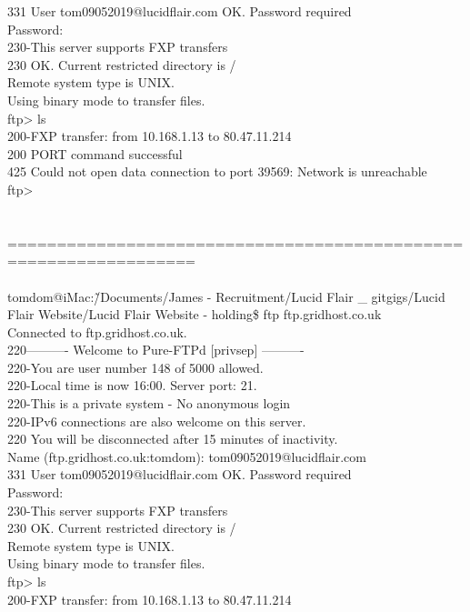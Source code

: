 \documentclass[10pt,a4paper]{article}
\begin{document}
{{{{{{{{{{{{{{{331 User tom09052019@lucidflair.com OK. Password required\\
Password:\\
230-This server supports FXP transfers\\
230 OK. Current restricted directory is /\\
Remote system type is UNIX.\\
Using binary mode to transfer files.\\
ftp> ls\\
200-FXP transfer: from 10.168.1.13 to 80.47.11.214\\
200 PORT command successful\\
425 Could not open data connection to port 39569: Network is unreachable\\
ftp> \\
\\
\\
=================================================================\\
\\
tomdom@iMac:\~/Documents/James - Recruitment/Lucid Flair \_ gitgigs/Lucid Flair Website/Lucid Flair Website - holding\$ ftp ftp.gridhost.co.uk\\
Connected to ftp.gridhost.co.uk.\\
220---------- Welcome to Pure-FTPd [privsep] ----------\\
220-You are user number 148 of 5000 allowed.\\
220-Local time is now 16:00. Server port: 21.\\
220-This is a private system - No anonymous login\\
220-IPv6 connections are also welcome on this server.\\
220 You will be disconnected after 15 minutes of inactivity.\\
Name (ftp.gridhost.co.uk:tomdom): tom09052019@lucidflair.com\\
331 User tom09052019@lucidflair.com OK. Password required\\
Password:\\
230-This server supports FXP transfers\\
230 OK. Current restricted directory is /\\
Remote system type is UNIX.\\
Using binary mode to transfer files.\\
ftp> ls\\
200-FXP transfer: from 10.168.1.13 to 80.47.11.214\\
}}}}}}}}}}}}}}}
\end{document}
